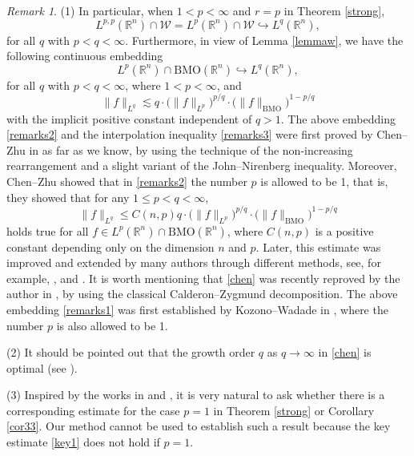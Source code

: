 \documentclass{birkjour}
\theoremstyle{definition}
\theoremstyle{remark}
\newtheorem{rem}[thm]{Remark}
\numberwithin{equation}{section}
\begin{document}
\begin{rem}\label{citeremark}
(1) In particular, when $1<p<\infty$ and $r=p$ in Theorem \ref{strong},
\begin{equation}\label{remarks1}
L^{p,p}(\mathbb R^n)\cap \mathcal{W}=L^p(\mathbb R^n)\cap \mathcal{W}\hookrightarrow L^q(\mathbb R^n),
\end{equation}
for all $q$ with $p<q<\infty$. Furthermore, in view of Lemma \ref{lemmaw}, we have the following continuous embedding
\begin{equation}\label{remarks2}
L^p(\mathbb R^n)\cap \mathrm{BMO}(\mathbb R^n)\hookrightarrow L^q(\mathbb R^n),
\end{equation}
for all $q$ with $p<q<\infty$, where $1<p<\infty$, and
\begin{equation}\label{remarks3}
\|f\|_{L^q}\lesssim q\cdot\big(\|f\|_{L^{p}}\big)^{p/q}\cdot\big(\|f\|_{\mathrm{BMO}}\big)^{1-p/q}
\end{equation}
with the implicit positive constant independent of $q>1$. The above embedding \eqref{remarks2} and the interpolation inequality \eqref{remarks3} were first proved by Chen--Zhu in \cite[Theorem 2]{Chen} as far as we know, by using the technique of the non-increasing rearrangement and a slight variant of the John--Nirenberg inequality. Moreover, Chen--Zhu showed that in \eqref{remarks2} the number $p$ is allowed to be 1, that is, they showed that for any $1\leq p<q<\infty$,
\begin{equation}\label{chen}
\|f\|_{L^q}\leq C(n,p)q\cdot\big(\|f\|_{L^p}\big)^{p/q}\cdot\big(\|f\|_{\mathrm{BMO}}\big)^{1-p/q}
\end{equation}
holds true for all $f\in L^p(\mathbb R^n)\cap \mathrm{BMO}(\mathbb R^n)$, where $C(n,p)$ is a positive constant depending only on the dimension $n$ and $p$. Later, this estimate was improved and extended by many authors through different methods,
see, for example, \cite[Theorems 2.1 and 2.2]{Kozono2}, \cite[Theorem 1.1]{wadade} and \cite[Lemma 3]{mil}. It is worth mentioning that \eqref{chen} was recently reproved by the author in \cite{wang}, by using the classical Calderon--Zygmund decomposition. The above embedding \eqref{remarks1} was first established by Kozono--Wadade in \cite[Lemmas 3.2 and 3.3]{Kozono2}, where the number $p$ is also allowed to be 1.

(2) It should be pointed out that the growth order $q$ as $q\to\infty$ in \eqref{chen} is optimal
(see \cite[Theorem 2.2 and Remark (iii)]{Kozono2}).

(3) Inspired by the works in \cite{Chen} and \cite{Kozono2}, it is very natural to ask whether there is a corresponding estimate for the case $p=1$ in Theorem \ref{strong} or Corollary \ref{cor33}. Our method cannot be used to establish such a result because the key estimate \eqref{key1} does not hold if $p=1$.
\end{rem}
\end{document}

